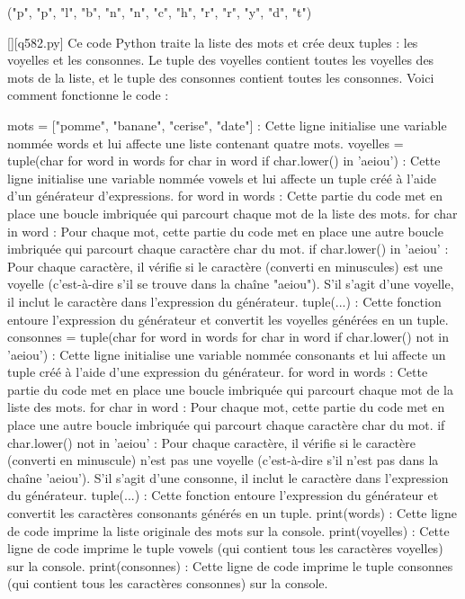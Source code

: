 ("p", "p", "l", "b", "n", "n", "c", "h", "r", "r", "y", "d", "t")
        \par
        \begin{solution}
            \renewcommand{\nomfichier}{q582.py}
            \pythonfile{\chemincode \nomfichier}[][\nomfichier]
            Ce code Python traite la liste des mots et crée deux tuples : les voyelles et les consonnes. Le tuple des voyelles contient toutes les voyelles des mots de la liste, et le tuple des consonnes contient toutes les consonnes. Voici comment fonctionne le code :

    mots = ["pomme", "banane", "cerise", "date"] : Cette ligne initialise une variable nommée words et lui affecte une liste contenant quatre mots.
    voyelles = tuple(char for word in words for char in word if char.lower() in 'aeiou') : Cette ligne initialise une variable nommée vowels et lui affecte un tuple créé à l'aide d'un générateur d'expressions.
        for word in words : Cette partie du code met en place une boucle imbriquée qui parcourt chaque mot de la liste des mots.
        for char in word : Pour chaque mot, cette partie du code met en place une autre boucle imbriquée qui parcourt chaque caractère char du mot.
        if char.lower() in 'aeiou' : Pour chaque caractère, il vérifie si le caractère (converti en minuscules) est une voyelle (c'est-à-dire s'il se trouve dans la chaîne "aeiou"). S'il s'agit d'une voyelle, il inclut le caractère dans l'expression du générateur.
        tuple(...) : Cette fonction entoure l'expression du générateur et convertit les voyelles générées en un tuple.
    consonnes = tuple(char for word in words for char in word if char.lower() not in 'aeiou') : Cette ligne initialise une variable nommée consonants et lui affecte un tuple créé à l'aide d'une expression du générateur.
        for word in words : Cette partie du code met en place une boucle imbriquée qui parcourt chaque mot de la liste des mots.
        for char in word : Pour chaque mot, cette partie du code met en place une autre boucle imbriquée qui parcourt chaque caractère char du mot.
        if char.lower() not in 'aeiou' : Pour chaque caractère, il vérifie si le caractère (converti en minuscule) n'est pas une voyelle (c'est-à-dire s'il n'est pas dans la chaîne 'aeiou'). S'il s'agit d'une consonne, il inclut le caractère dans l'expression du générateur.
        tuple(...) : Cette fonction entoure l'expression du générateur et convertit les caractères consonants générés en un tuple.
    print(words) : Cette ligne de code imprime la liste originale des mots sur la console.
    print(voyelles) : Cette ligne de code imprime le tuple vowels (qui contient tous les caractères voyelles) sur la console.
    print(consonnes) : Cette ligne de code imprime le tuple consonnes (qui contient tous les caractères consonnes) sur la console.
        \end{solution}
        

